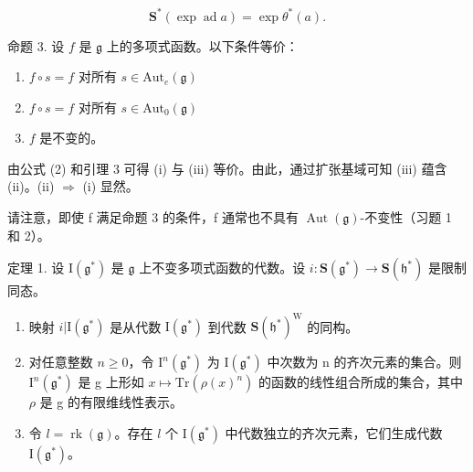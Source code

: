 \[
\mathbf {S} ^ {*} (\exp \operatorname{ad} a) = \exp \theta^ {*} (a).\tag{2}
\]

命题 3. 设 \(f\) 是 \(\mathfrak{g}\) 上的多项式函数。以下条件等价：

\begin{enumerate}
\def\labelenumi{(\roman{enumi})}
\item
  \(f\circ s = f\) 对所有 \(s\in \mathrm{Aut}_e(\mathfrak{g})\)
\item
  \(f\circ s = f\) 对所有 \(s\in \mathrm{Aut}_0(\mathfrak{g})\)
\item
  \(f\) 是不变的。
\end{enumerate}

由公式 (2) 和引理 3 可得 (i) 与 (iii) 等价。由此，通过扩张基域可知 (iii) 蕴含 (ii)。(ii) \(\Longrightarrow\) (i) 显然。

请注意，即使 f 满足命题 3 的条件，f 通常也不具有 \(\operatorname{Aut}(\mathfrak{g})\)-不变性（习题 1 和 2）。

定理 1. 设 \(\mathrm{I}(\mathfrak{g}^*)\) 是 \(\mathfrak{g}\) 上不变多项式函数的代数。设 \(i: \mathbf{S}(\mathfrak{g}^*) \to \mathbf{S}(\mathfrak{h}^*)\) 是限制同态。

\begin{enumerate}
\def\labelenumi{(\roman{enumi})}
\item
  映射 \(i|\mathrm{I}(\mathfrak{g}^*)\) 是从代数 \(\mathrm{I}(\mathfrak{g}^*)\) 到代数 \(\mathbf{S}(\mathfrak{h}^*)^{\mathrm{W}}\) 的同构。
\item
  对任意整数 \(n \geq 0\)，令 \(\mathrm{I}^{n}(\mathfrak{g}^{*})\) 为 \(\mathrm{I}(\mathfrak{g}^{*})\) 中次数为 n 的齐次元素的集合。则 \(\mathrm{I}^{n}(\mathfrak{g}^{*})\) 是 g 上形如 \(x \mapsto \mathrm{Tr}(\rho(x)^{n})\) 的函数的线性组合所成的集合，其中 \(\rho\) 是 g 的有限维线性表示。
\item
  令 \(l = \operatorname{rk}(\mathfrak{g})\)。存在 \(l\) 个 \(\mathrm{I}(\mathfrak{g}^*)\) 中代数独立的齐次元素，它们生成代数 \(\mathrm{I}(\mathfrak{g}^*)\)。
\end{enumerate}

